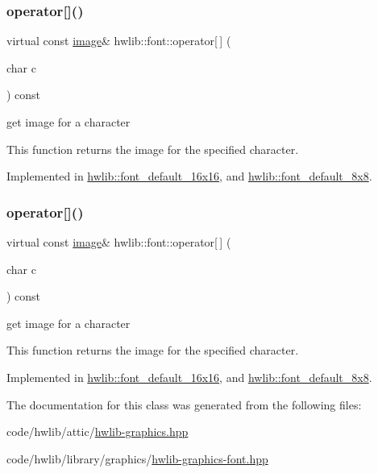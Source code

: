 \subsubsection{\texorpdfstring{operator[]()}{operator[]()}\hspace{0.1cm}{\footnotesize\ttfamily [1/2]}}
{\footnotesize\ttfamily virtual const \hyperlink{classhwlib_1_1image}{image}\& hwlib\+::font\+::operator\mbox{[}$\,$\mbox{]} (\begin{DoxyParamCaption}\item[{char}]{c }\end{DoxyParamCaption}) const\hspace{0.3cm}{\ttfamily [pure virtual]}}

get image for a character

This function returns the image for the specified character. 

Implemented in \hyperlink{classhwlib_1_1font__default__16x16_a0ad5e4c209117827ba854fb4e0a2717d}{hwlib\+::font\+\_\+default\+\_\+16x16}, and \hyperlink{classhwlib_1_1font__default__8x8_a56cbd6602a4850a957cb26f1f5d6ae85}{hwlib\+::font\+\_\+default\+\_\+8x8}.

\mbox{\label{classhwlib_1_1font_a723595f70f1e042db23d3140b1d4cad8}} 
\subsubsection{\texorpdfstring{operator[]()}{operator[]()}\hspace{0.1cm}{\footnotesize\ttfamily [2/2]}}
{\footnotesize\ttfamily virtual const \hyperlink{classhwlib_1_1image}{image}\& hwlib\+::font\+::operator\mbox{[}$\,$\mbox{]} (\begin{DoxyParamCaption}\item[{char}]{c }\end{DoxyParamCaption}) const\hspace{0.3cm}{\ttfamily [pure virtual]}}



get image for a character 

This function returns the image for the specified character. 

Implemented in \hyperlink{classhwlib_1_1font__default__16x16_a0ad5e4c209117827ba854fb4e0a2717d}{hwlib\+::font\+\_\+default\+\_\+16x16}, and \hyperlink{classhwlib_1_1font__default__8x8_a56cbd6602a4850a957cb26f1f5d6ae85}{hwlib\+::font\+\_\+default\+\_\+8x8}.



The documentation for this class was generated from the following files\+:\begin{DoxyCompactItemize}
\item 
code/hwlib/attic/\hyperlink{hwlib-graphics_8hpp}{hwlib-\/graphics.\+hpp}\item 
code/hwlib/library/graphics/\hyperlink{hwlib-graphics-font_8hpp}{hwlib-\/graphics-\/font.\+hpp}\end{DoxyCompactItemize}
